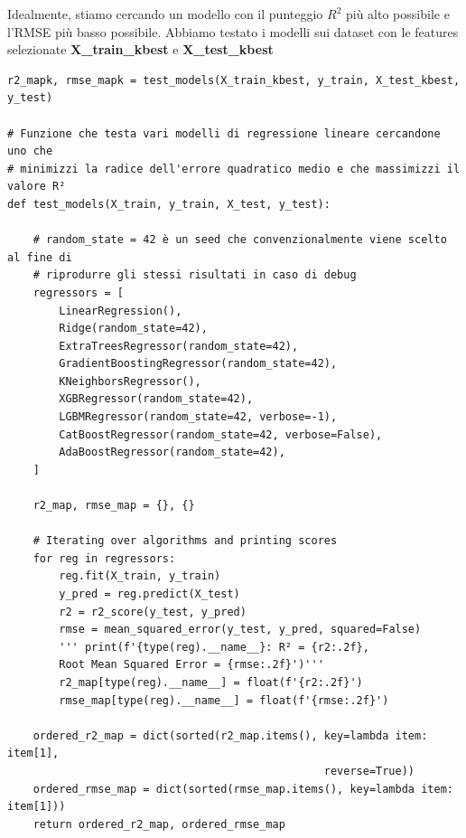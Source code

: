 \documentclass{article}
\begin{document}
Idealmente, stiamo cercando un modello con il punteggio $R^2$ più alto possibile e l'RMSE più basso possibile.
Abbiamo testato i modelli sui dataset con le features selezionate \textbf{X\_train\_kbest} e \textbf{X\_test\_kbest} 
\begin{verbatim}
r2_mapk, rmse_mapk = test_models(X_train_kbest, y_train, X_test_kbest, y_test)

# Funzione che testa vari modelli di regressione lineare cercandone uno che 
# minimizzi la radice dell'errore quadratico medio e che massimizzi il valore R²
def test_models(X_train, y_train, X_test, y_test):

    # random_state = 42 è un seed che convenzionalmente viene scelto al fine di 
    # riprodurre gli stessi risultati in caso di debug
    regressors = [
        LinearRegression(),
        Ridge(random_state=42),
        ExtraTreesRegressor(random_state=42),
        GradientBoostingRegressor(random_state=42),
        KNeighborsRegressor(),
        XGBRegressor(random_state=42),
        LGBMRegressor(random_state=42, verbose=-1),
        CatBoostRegressor(random_state=42, verbose=False),
        AdaBoostRegressor(random_state=42),
    ]

    r2_map, rmse_map = {}, {}

    # Iterating over algorithms and printing scores
    for reg in regressors:
        reg.fit(X_train, y_train)
        y_pred = reg.predict(X_test)
        r2 = r2_score(y_test, y_pred)
        rmse = mean_squared_error(y_test, y_pred, squared=False)
        ''' print(f'{type(reg).__name__}: R² = {r2:.2f},
        Root Mean Squared Error = {rmse:.2f}')'''
        r2_map[type(reg).__name__] = float(f'{r2:.2f}')
        rmse_map[type(reg).__name__] = float(f'{rmse:.2f}')

    ordered_r2_map = dict(sorted(r2_map.items(), key=lambda item: item[1], 
                                                 reverse=True))
    ordered_rmse_map = dict(sorted(rmse_map.items(), key=lambda item: item[1]))
    return ordered_r2_map, ordered_rmse_map
\end{verbatim}
\end{document}
